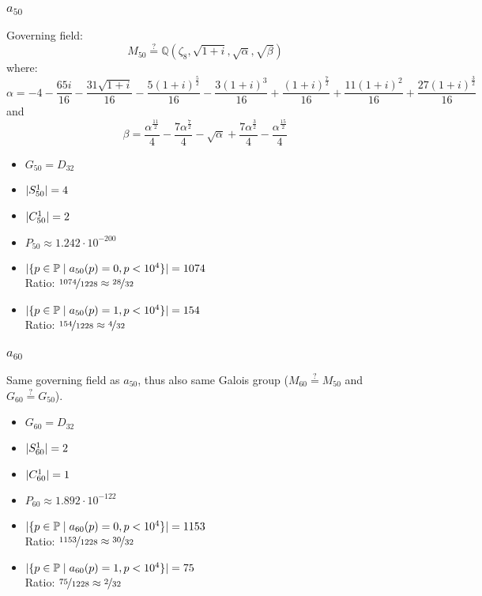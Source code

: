 \subsubsection{$a_{50}$}
Governing field:
$$M_{50} \stackrel{?}{=} \mathbb{Q}\left(\zeta_8, \sqrt{1+i}, \sqrt{\alpha}, \sqrt{\beta}\right)$$
where:
$$\alpha = -4 - \frac{65 i}{16} - \frac{31 \sqrt{1 + i}}{16} - \frac{5 \left(1 + i\right)^{\frac{5}{2}}}{16} - \frac{3 \left(1 + i\right)^{3}}{16} + \frac{\left(1 + i\right)^{\frac{7}{2}}}{16} + \frac{11 \left(1 + i\right)^{2}}{16} + \frac{27 \left(1 + i\right)^{\frac{3}{2}}}{16}$$
and 
$$\beta = \frac{\alpha^{\frac{11}{2}}}{4} - \frac{7 \alpha^{\frac{7}{2}}}{4} - \sqrt{\alpha} + \frac{7 \alpha^{\frac{3}{2}}}{4} - \frac{\alpha^{\frac{15}{2}}}{4}$$
\begin{multicols}{2}
	\begin{itemize}
		\item $G_{50} = D_{32}$
		\item $| S_{50}^1 | = 4$
		\item $| C_{50}^1 | = 2$
		\item $P_{50} \approx 1.242 \cdot 10^{-200}$
	\end{itemize}
	\begin{itemize}
		\item $| \{ p \in \mathbb{P} \mid a_{50}(p)=0, p<10^4 \} | = 1074$\\
		Ratio: $\nicefrac{ 1074 }{ 1228 } \approx \nicefrac{ 28 }{ 32 }$
		\item $| \{ p \in \mathbb{P} \mid a_{50}(p)=1, p<10^4 \} | = 154$\\
		Ratio: $\nicefrac{ 154 }{ 1228 } \approx \nicefrac{ 4 }{ 32 }$
	\end{itemize}
\end{multicols}

\subsubsection{$a_{60}$}
Same governing field as $a_{50}$, thus also same Galois group ($M_{60} \stackrel{?}{=} M_{50}$ and $G_{60} \stackrel{?}{=} G_{50}$).
\begin{multicols}{2}
	\begin{itemize}
		\item $G_{60} = D_{32}$
		\item $| S_{60}^1 | = 2$
		\item $| C_{60}^1 | = 1$
		\item $P_{60} \approx 1.892 \cdot 10^{-122}$
	\end{itemize}
	\begin{itemize}
		\item $| \{ p \in \mathbb{P} \mid a_{60}(p)=0, p<10^4 \} | = 1153$\\
		Ratio: $\nicefrac{ 1153 }{ 1228 } \approx \nicefrac{ 30 }{ 32 }$
		\item $| \{ p \in \mathbb{P} \mid a_{60}(p)=1, p<10^4 \} | = 75$\\
		Ratio: $\nicefrac{ 75 }{ 1228 } \approx \nicefrac{ 2 }{ 32 }$
	\end{itemize}
\end{multicols}

